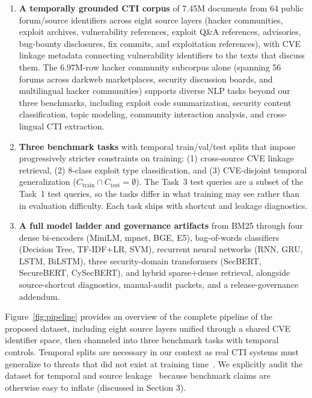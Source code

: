 \documentclass{article}
\begin{document}
\begin{enumerate}
  \item \textbf{A temporally grounded CTI corpus} of 7.45M documents from 64 public forum/source identifiers across eight source layers (hacker communities, exploit archives, vulnerability references, exploit Q\&A references, advisories, bug-bounty disclosures, fix commits, and exploitation references), with CVE linkage metadata connecting vulnerability identifiers to the texts that discuss them. The 6.97M-row hacker community subcorpus alone (spanning 56 forums across darkweb marketplaces, security discussion boards, and multilingual hacker communities) supports diverse NLP tasks beyond our three benchmarks, including exploit code summarization, security content classification, topic modeling, community interaction analysis, and cross-lingual CTI extraction.

  \item \textbf{Three benchmark tasks} with temporal train/val/test splits that impose progressively stricter constraints on training: (1) cross-source CVE linkage retrieval, (2) 8-class exploit type classification, and (3) CVE-disjoint temporal generalization ($C_{\text{train}} \cap C_{\text{test}} = \emptyset$). The Task~3 test queries are a subset of the Task~1 test queries, so the tasks differ in what training may see rather than in evaluation difficulty. Each task ships with shortcut and leakage diagnostics.

  \item \textbf{A full model ladder and governance artifacts} from BM25 through four dense bi-encoders (MiniLM, mpnet, BGE, E5), bag-of-words classifiers (Decision Tree, TF-IDF+LR, SVM), recurrent neural networks (RNN, GRU, LSTM, BiLSTM), three security-domain transformers (SecBERT, SecureBERT, CySecBERT), and hybrid sparse+dense retrieval, alongside source-shortcut diagnostics, manual-audit packets, and a release-governance addendum.
\end{enumerate}

\noindent Figure~\ref{fig:pipeline} provides an overview of the complete pipeline of the proposed dataset, including eight source layers unified through a shared CVE identifier space, then channeled into three benchmark tasks with temporal controls. Temporal splits are necessary in our context as real CTI systems must generalize to threats that did not exist at training time~\citep{koh2021wilds}. We explicitly audit the dataset for temporal and source leakage~\citep{kapoor2023leakage} because benchmark claims are otherwise easy to inflate (discussed in Section 3).
\end{document}
